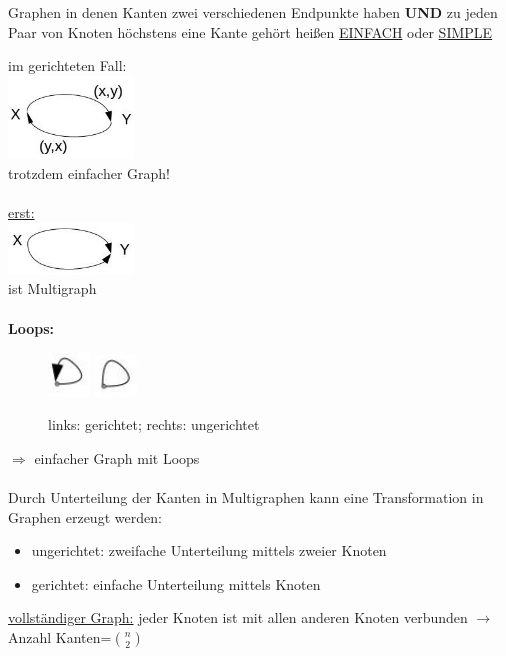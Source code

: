 Graphen in denen Kanten zwei verschiedenen Endpunkte haben \textbf{UND} zu jeden Paar von Knoten höchstens eine Kante gehört heißen \underline{EINFACH} oder \underline{SIMPLE}

im gerichteten Fall:\\
\includegraphics[width=0.25\textwidth]{lectures/161014/pix/1.jpg}
\\
trotzdem einfacher Graph!\\
\\
\underline{erst:}\\
\includegraphics[width=0.25\textwidth]{lectures/161014/pix/2.jpg}
\\
ist Multigraph
\\\\
\textbf{Loops:}
\begin{figure}[ht]
	\centering
  	\includegraphics[width=0.1\textwidth]{lectures/161014/pix/3.jpg}
  	\includegraphics[width=0.1\textwidth]{lectures/161014/pix/4.jpg}
	\caption{links: gerichtet; rechts: ungerichtet}
\end{figure}

$\Rightarrow$ einfacher Graph mit Loops
\\\\
Durch Unterteilung der Kanten in Multigraphen kann eine Transformation in Graphen erzeugt werden:
\begin{itemize}
	\item ungerichtet: zweifache Unterteilung mittels zweier Knoten
	\item gerichtet: einfache Unterteilung mittels Knoten
\end{itemize}

\underline{vollständiger Graph:} jeder Knoten ist mit allen anderen Knoten verbunden $\rightarrow$ Anzahl Kanten=$\binom{n}{2}$

